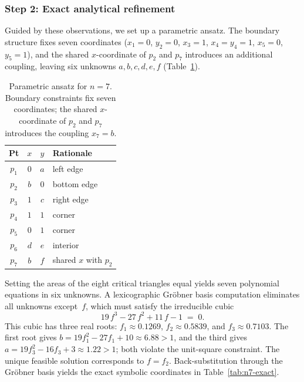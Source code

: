 \documentclass[11pt,a4paper]{article}
\theoremstyle{plain}
\theoremstyle{definition}
\theoremstyle{remark}
\begin{document}
  \subsubsection*{Step 2: Exact analytical refinement}

  Guided by these observations, we set up a parametric ansatz.
  The boundary structure fixes seven coordinates
  ($x_1 = 0$, $y_2 = 0$, $x_3 = 1$, $x_4 = y_4 = 1$, $x_5 = 0$, $y_5 = 1$),
  and the shared $x$-coordinate of $p_2$ and $p_7$ introduces an additional coupling,
  leaving six unknowns $a, b, c, d, e, f$ (Table~\ref{tab:n7-parametric}).

  \begin{table}[h]
    \centering
    \begin{tabular}{c c c l}
    \toprule
    Pt & $x$ & $y$ & Rationale \\
    \midrule
    $p_1$ & $0$ & $a$ & left edge \\
    $p_2$ & $b$ & $0$ & bottom edge \\
    $p_3$ & $1$ & $c$ & right edge \\
    $p_4$ & $1$ & $1$ & corner \\
    $p_5$ & $0$ & $1$ & corner \\
    $p_6$ & $d$ & $e$ & interior \\
    $p_7$ & $b$ & $f$ & shared $x$ with $p_2$ \\
    \bottomrule
    \end{tabular}
    \caption{Parametric ansatz for $n=7$. Boundary constraints
    fix seven coordinates; the shared $x$-coordinate of $p_2$
    and $p_7$ introduces the coupling $x_7 = b$.}
    \label{tab:n7-parametric}
  \end{table}

  Setting the areas of the eight critical triangles equal yields
  seven polynomial equations in six unknowns.
  A lexicographic Gröbner basis computation eliminates all unknowns
  except~$f$, which must satisfy the irreducible cubic
  \[
    19\,f^{3} - 27\,f^{2} + 11\,f - 1 \;=\; 0.
  \]
  This cubic has three real roots:
  $f_1 \approx 0.1269$,
  $f_2 \approx 0.5839$, and
  $f_3 \approx 0.7103$.
  The first root gives $b = 19f_1^2 - 27f_1 + 10 \approx 6.88 > 1$,
  and the third gives $a = 19f_3^2 - 16f_3 + 3 \approx 1.22 > 1$;
  both violate the unit-square constraint.
  The unique feasible solution corresponds to $f = f_2$.
  Back-substitution through the Gröbner basis yields the
  exact symbolic coordinates in Table~\ref{tab:n7-exact}.
\end{document}
